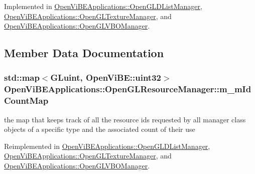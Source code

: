 Implemented in \hyperlink{classOpenViBEApplications_1_1OpenGLDListManager_a04d7e58a00105181e915bd39b25da69f}{OpenViBEApplications::OpenGLDListManager}, \hyperlink{classOpenViBEApplications_1_1OpenGLTextureManager_a7a13328ef662012d89d75e28b93b48d2}{OpenViBEApplications::OpenGLTextureManager}, and \hyperlink{classOpenViBEApplications_1_1OpenGLVBOManager_a96ea877a37aa1fccf4922e309c5b6c3b}{OpenViBEApplications::OpenGLVBOManager}.



\subsection{Member Data Documentation}
\hypertarget{classOpenViBEApplications_1_1OpenGLResourceManager_a5dfc8286721f8ec13adc4a0f7209e3e4}{
\subsubsection[{m\_\-mIdCountMap}]{\setlength{\rightskip}{0pt plus 5cm}std::map$<$GLuint, OpenViBE::uint32$>$ {\bf OpenViBEApplications::OpenGLResourceManager::m\_\-mIdCountMap}}}
\label{classOpenViBEApplications_1_1OpenGLResourceManager_a5dfc8286721f8ec13adc4a0f7209e3e4}
the map that keeps track of all the resource ids requested by all manager class objects of a specific type and the associated count of their use 

Reimplemented in \hyperlink{classOpenViBEApplications_1_1OpenGLDListManager_a31268e40c062e0b0b5f5632a79a685b4}{OpenViBEApplications::OpenGLDListManager}, \hyperlink{classOpenViBEApplications_1_1OpenGLTextureManager_abd308f1802ef4570dc6fce3f6b7ce35c}{OpenViBEApplications::OpenGLTextureManager}, and \hyperlink{classOpenViBEApplications_1_1OpenGLVBOManager_acfb996b9b393aa341efa02034e26c37c}{OpenViBEApplications::OpenGLVBOManager}.

